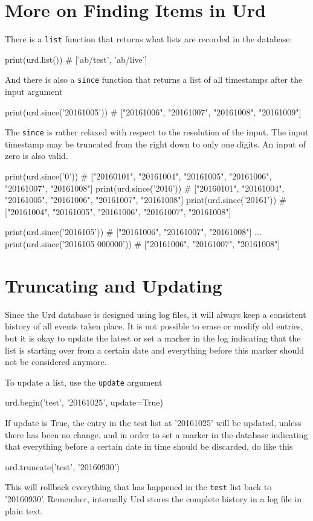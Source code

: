 \section{More on Finding Items in Urd}
There is a \texttt{list} function that returns what lists are recorded
in the database:
\begin{pythonBEG}
  print(urd.list())
  # ['ab/test', 'ab/live']
\end{pythonBEG}
And there is also a \texttt{since} function that returns a list of all
timestamps after the input argument
\begin{pythonMID}
  print(urd.since('20161005'))
  # ["20161006", "20161007", "20161008", "20161009"]
\end{pythonMID}
The \texttt{since} is rather relaxed with respect to the resolution of
the input.  The input timestamp may be truncated from the right down
to only one digits.  An input of zero is also valid.
\begin{pythonEND}
  print(urd.since('0'))
  # ["20160101", "20161004", "20161005", "20161006", "20161007", "20161008"]
  print(urd.since('2016'))
  # ["20160101", "20161004", "20161005", "20161006", "20161007", "20161008"]
  print(urd.since('20161'))
  # ["20161004", "20161005", "20161006", "20161007", "20161008"]

  print(urd.since('2016105'))
  # ["20161006", "20161007", "20161008"]
  ...
  print(urd.since('2016105 000000'))
  # ["20161006", "20161007", "20161008"]
\end{pythonEND}



\section{Truncating and Updating}
\label{sec:trunc-update}
Since the Urd database is designed using log files, it will always
keep a consistent history of all events taken place.  It is not
possible to erase or modify old entries, but it is okay to update the
latest or set a marker in the log indicating that the list is starting
over from a certain date and everything before this marker should not
be considered anymore.

To update a list, use the \texttt{update} argument
\begin{python}
urd.begin('test', '20161025', update=True)
\end{python}
If update is True, the entry in the test list at '20161025' will be
updated, unless there has been no change.  and in order to set a
marker in the database indicating that everything before a certain
date in time should be discarded, do like this
\begin{python}
urd.truncate('test', '20160930')
\end{python}
This will rollback everything that has happened in the \texttt{test}
list back to '20160930'.  Remember, internally Urd stores the complete
history in a log file in plain text.


